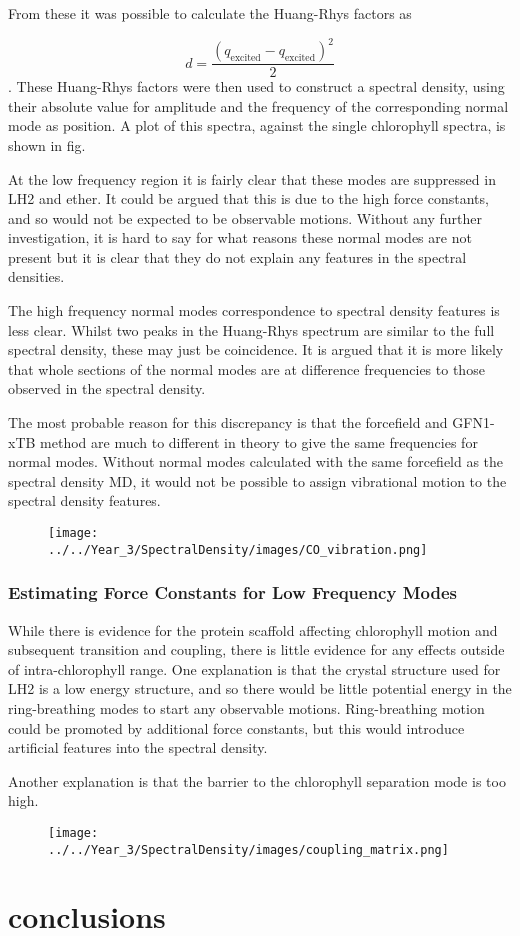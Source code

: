 From these it was possible to calculate the Huang-Rhys factors as

\begin{equation}
    d = \frac{\left(q_{\text{excited}} - q_{\text{excited}}\right)^2}{2}
\end{equation}
%
. These Huang-Rhys factors were then used to construct a spectral density, using
their absolute value for amplitude and the frequency of the corresponding normal
mode as position. A plot of this spectra, against the single chlorophyll spectra,
is shown in fig.

At the low frequency region it is fairly clear that these modes are suppressed in
LH2 and ether. It could be argued that this is due to the high force constants, 
and so would not be expected to be observable motions. Without any further investigation,
it is hard to say for what reasons these normal modes are not present but it is 
clear that they do not explain any features in the spectral densities.

The high frequency normal modes correspondence to spectral density features is less
clear. Whilst two peaks in the Huang-Rhys spectrum are similar to the full spectral
density, these may just be coincidence. It is argued that it is more likely that 
whole sections of the normal modes are at difference frequencies to those observed
in the spectral density.

The most probable reason for this discrepancy is that the forcefield and GFN1-xTB
method are much to different in theory to give the same frequencies for normal modes.
Without normal modes calculated with the same forcefield as the spectral density
MD, it would not be possible to assign vibrational motion to the spectral density
features.

\begin{figure}
    \texttt{[image: ../../Year\_3/SpectralDensity/images/CO\_vibration.png]}
\end{figure}

\subsubsection{Estimating Force Constants for Low Frequency Modes}
\label{subsubsec:force_constants}

While there is evidence for the protein scaffold affecting chlorophyll motion and
subsequent \Qy transition and coupling, there is little evidence for any effects
outside of intra-chlorophyll range. One explanation is that the crystal structure
used for LH2 is a low energy structure, and so there would be little potential energy
in the ring-breathing modes to start any observable motions. Ring-breathing motion
could be promoted by additional force constants, but this would introduce artificial
features into the spectral density.

Another explanation is that the barrier to the chlorophyll separation mode is too 
high. 

\begin{figure}
    \texttt{[image: ../../Year\_3/SpectralDensity/images/coupling\_matrix.png]}
\end{figure}

\section{conclusions}
\label{sec:specdens_concs}